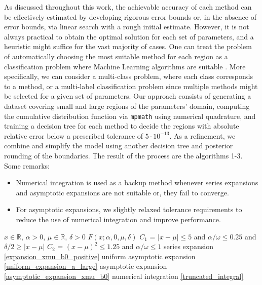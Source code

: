 \documentclass[10pt,a4paper,oneside]{article}
\numberwithin{equation}{section}
\begin{document}
As discussed throughout this work, the achievable accuracy of each method can be effectively estimated by developing rigorous error bounds or, in the absence of error bounds, via linear search with a rough initial estimate. However, it is not always practical to obtain the optimal solution for each set of parameters, and a heuristic might suffice for the vast majority of cases. One can treat the problem of automatically choosing the most suitable method for each region as a classification problem where Machine Learning algorithms are suitable \cite{Simpson2016, Navas-Palencia2019}. More specifically, we can consider a multi-class problem, where each class corresponds to a method, or a multi-label classification problem since multiple methods might be selected for a given set of parameters.
Our approach consists of generating a dataset covering small and large regions of the parameters' domain, computing the cumulative distribution function via \texttt{mpmath} \cite{mpmath} using numerical quadrature, and training a decision tree for each method to decide the regions with absolute relative error below a prescribed tolerance of $5\cdot 10^{-13}$. As a refinement, we combine and simplify the model using another decision tree and posterior rounding of the boundaries. The result of the process are the algorithms 1-3. Some remarks:
\begin{itemize}
\item Numerical integration is used as a backup method whenever series expansions and asymptotic expansions are not suitable or, they fail to converge.
\item For asymptotic expansions, we slightly relaxed tolerance requirements to reduce the use of numerical integration and improve performance.
\end{itemize}

{\centering
\begin{minipage}{.8\linewidth}
  \begin{algorithm}[H]
  \small
  \caption{Algorithm for special case $\beta = 0$, $F(x; \alpha, 0, \mu, \delta)$}\label{alg:case_beta_eq_zero}
\begin{algorithmic}
\Require $x \in \mathbb{R}$, $\alpha > 0$, $\mu \in \mathbb{R}$, $\delta > 0$
\Ensure $F(x; \alpha, 0, \mu, \delta)$
\State $C_1$ = $|x-\mu| \le 5$ and $\alpha / \omega \le 0.25$ and $\delta/2 \ge |x-\mu| $
\State $C_2$ = $(x-\mu)^2 \le 1.25$ and $\alpha / \omega \le 1$
    \State series expansion \eqref{expansion_xmu_b0_positive}
    \State uniform asymptotic expansion \eqref{uniform_expansion_a_large}
    \State asymptotic expansion \eqref{asymptotic_expansion_xmu_b0}
\Else
	\State numerical integration \eqref{truncated_integral}
\EndIf
\end{algorithmic}
  \end{algorithm}
\end{minipage}
\par
}
\end{document}
